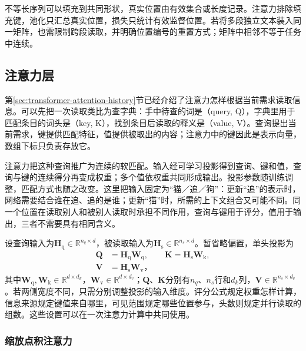 不等长序列可以填充到共同形状，真实位置由有效集合或长度记录。注意力排除填充键，池化只汇总真实位置，损失只统计有效监督位置。若将多段独立文本装入同一矩阵，也需限制跨段读取，并明确位置编号的重置方式；矩阵中相邻不等于任务中连续。

\subsection{注意力层}
\label{sec:transformer-attention}

第\ref{sec:transformer-attention-history}节已经介绍了注意力怎样根据当前需求读取信息。可以先把一次读取类比为查字典：手中待查的词是（query, Q），字典里用于匹配条目的词头是（key, K），找到条目后读取的释义是（value, V）。查询提出当前需求，键提供匹配特征，值提供被取出的内容；注意力中的键因此是表示向量，数组下标只负责存放它。

注意力把这种查询推广为连续的软匹配。输入经可学习投影得到查询、键和值，查询与键的连续得分再变成权重；多个值依权重共同形成输出。投影参数随训练调整，匹配方式也随之改变。这里把输入固定为“猫／追／狗”：更新“追”的表示时，网络需要结合谁在追、追的是谁；更新“猫”时，所需的上下文组合又可能不同。同一个位置在读取别人和被别人读取时承担不同作用，查询与键用于评分，值用于输出，三者不需要具有相同含义。

设查询输入为$\bm H_{\mathrm q}\in\mathbb R^{n_q\times d}$，被读取输入为$\bm H_{\mathrm s}\in\mathbb R^{n_s\times d}$。暂省略偏置，单头投影为
\begin{equation}
  \begin{aligned}
    \bm Q&=\bm H_{\mathrm q}\bm W_{\mathrm q},\qquad
    \bm K=\bm H_{\mathrm s}\bm W_{\mathrm k},\\
    \bm V&=\bm H_{\mathrm s}\bm W_{\mathrm v}\text{，}
  \end{aligned}
  \label{eq:transformer-qkv}
\end{equation}
其中$\bm W_{\mathrm q},\bm W_{\mathrm k}\in\mathbb R^{d\times d_k}$，$\bm W_{\mathrm v}\in\mathbb R^{d\times d_v}$；$\bm Q$、$\bm K$分别有$n_q$、$n_s$行和$d_k$列，$\bm V\in\mathbb R^{n_s\times d_v}$。若两侧宽度不同，只需分别调整投影的输入维度。评分公式规定权重怎样计算，信息来源规定键值来自哪里，可见范围规定哪些位置参与，头数则规定并行读取的组数。这些设置可以在一次注意力计算中共同使用。

\subsubsection{缩放点积注意力}

